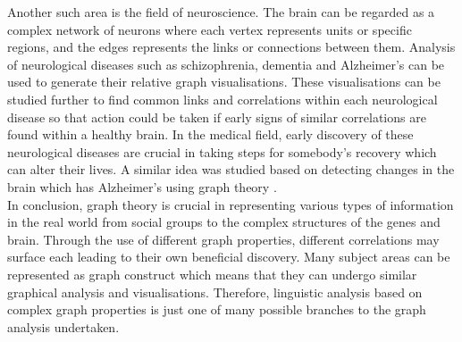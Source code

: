 Another such area is the field of neuroscience. The brain \cite{de2014graph} can be regarded as a complex network of neurons where each vertex represents units or specific regions, and the edges represents the links or connections between them. Analysis of neurological diseases such as schizophrenia, dementia and Alzheimer's can be used to generate their relative graph visualisations. These visualisations can be studied further to find common links and correlations within each neurological disease so that action could be taken if early signs of similar correlations are found within a healthy brain. In the medical field, early discovery of these neurological diseases are crucial in taking steps for somebody's recovery which can alter their lives. A similar idea was studied based on detecting changes in the brain which has Alzheimer's using graph theory \cite{10.1093/braincomms/fcaa129}.\\


\noindent In conclusion, graph theory is crucial in representing various types of information in the real world from social groups to the complex structures of the genes and brain. Through the use of different graph properties, different correlations may surface each leading to their own beneficial discovery. Many subject areas can be represented as graph construct which means that they can undergo similar graphical analysis and visualisations. Therefore, linguistic analysis based on complex graph properties is just one of many possible branches to the graph analysis undertaken.